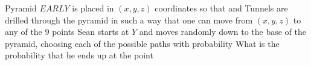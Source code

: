 Pyramid $EARLY$ is placed in $(x,y,z)$ coordinates so that    and   Tunnels are drilled through the pyramid in such a way that one can move from $(x,y,z)$ to any of the $9$ points      Sean starts at $Y$ and moves randomly down to the base of the pyramid, choosing each of the possible paths with probability   What is the probability that he ends up at the point 